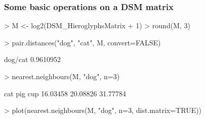 \documentclass[t]{beamer} %
\begin{document}
\begin{frame}[fragile]
  \frametitle{Some basic operations on a DSM matrix}

\begin{Rcode}
> M <- log2(DSM_HieroglyphsMatrix + 1) 
> round(M, 3)

> pair.distances("dog", "cat", M, convert=FALSE)\begin{Rout}
  dog/cat 
0.9610952\end{Rout}

> nearest.neighbours(M, "dog", n=3)\begin{Rout}
     cat      pig      cup 
16.03458 20.08826 31.77784\end{Rout}

> plot(nearest.neighbours(M, "dog", n=3, dist.matrix=TRUE))
\end{Rcode}

\end{frame}




\end{document}
